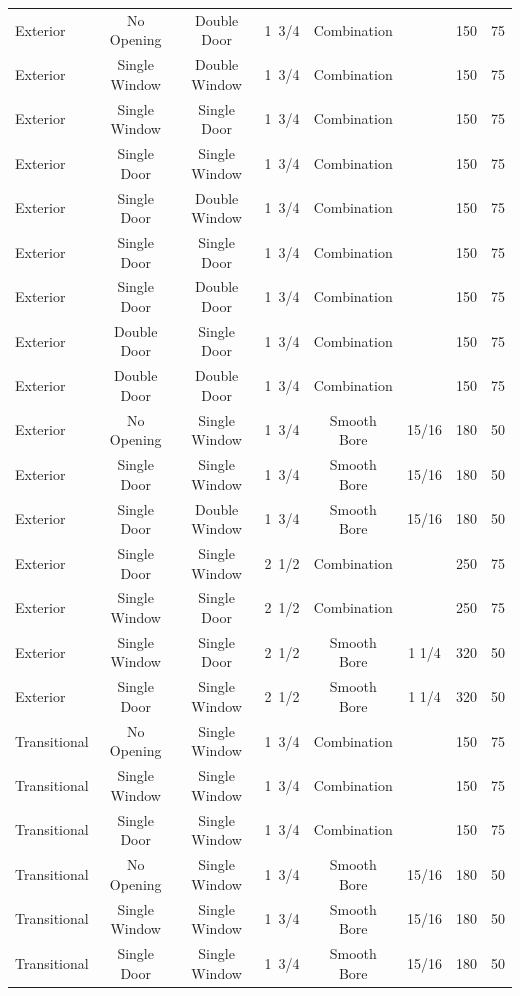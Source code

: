 \documentclass[12pt,oneside]{book}
\begin{document}
\begin{table}[!ht]
\begin{tabular}{lccccccc}
Exterior & No Opening      & Double Door     & 1~3/4 & Combination &       & 150 & 75 \\
Exterior & Single Window   & Double Window   & 1~3/4 & Combination &       & 150 & 75 \\
Exterior & Single Window   & Single Door     & 1~3/4 & Combination &       & 150 & 75 \\
Exterior & Single Door     & Single Window   & 1~3/4 & Combination &       & 150 & 75 \\
Exterior & Single Door     & Double Window   & 1~3/4 & Combination &       & 150 & 75 \\
Exterior & Single Door     & Single Door     & 1~3/4 & Combination &       & 150 & 75 \\
Exterior & Single Door     & Double Door     & 1~3/4 & Combination &       & 150 & 75 \\
Exterior & Double Door     & Single Door     & 1~3/4 & Combination &       & 150 & 75 \\
Exterior & Double Door     & Double Door     & 1~3/4 & Combination &       & 150 & 75 \\
Exterior & No Opening      & Single Window   & 1~3/4 & Smooth Bore & 15/16 & 180 & 50 \\
Exterior & Single Door     & Single Window   & 1~3/4 & Smooth Bore & 15/16 & 180 & 50 \\
Exterior & Single Door     & Double Window   & 1~3/4 & Smooth Bore & 15/16 & 180 & 50 \\
Exterior & Single Door     & Single Window   & 2~1/2 & Combination &       & 250 & 75 \\
Exterior & Single Window   & Single Door     & 2~1/2 & Combination &       & 250 & 75 \\
Exterior & Single Window   & Single Door     & 2~1/2 & Smooth Bore & 1 1/4 & 320 & 50 \\
Exterior & Single Door     & Single Window   & 2~1/2 & Smooth Bore & 1 1/4 & 320 & 50 \\
\midrule
Transitional & No Opening  & Single Window   & 1~3/4 & Combination &  & 150 & 75 \\
Transitional & Single Window & Single Window & 1~3/4 & Combination &  & 150 & 75 \\
Transitional & Single Door & Single Window   & 1~3/4 & Combination &  & 150 & 75 \\
Transitional & No Opening  & Single Window   & 1~3/4 & Smooth Bore & 15/16 & 180 & 50 \\
Transitional & Single Window & Single Window & 1~3/4 & Smooth Bore & 15/16 & 180 & 50 \\
Transitional & Single Door & Single Window   & 1~3/4 & Smooth Bore & 15/16 & 180 & 50 \\ 
\bottomrule[1.25pt]
\end{tabular}
\end{table}
\end{document}
